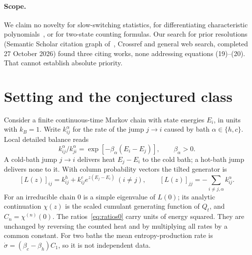 \documentclass[11pt,a4paper]{article}
\theoremstyle{remark}\newtheorem{remark}[theorem]{Remark}
\begin{document}
\paragraph{Scope.} We claim no novelty for slow-switching statistics, for differentiating characteristic polynomials~\cite{Bruderer2014}, or for two-state counting formulas. Our search for prior resolutions (Semantic Scholar citation graph of~\cite{Ptaszynski2022}, Crossref and general web search, completed 27 October 2026) found three citing works, none addressing equations (19)--(20). That cannot establish absolute priority.

\section{Setting and the conjectured class}\label{sec:defs}
Consider a finite continuous-time Markov chain with state energies $E_i$, in units with $k_B=1$. Write $k^\alpha_{ij}$ for the rate of the jump $j\to i$ caused by bath $\alpha\in\{h,c\}$. Local detailed balance reads
\begin{equation}\label{eq:ldb}
k^\alpha_{ij}/k^\alpha_{ji}=\exp[-\beta_\alpha(E_i-E_j)],\qquad\beta_\alpha>0.
\end{equation}
A cold-bath jump $j\to i$ delivers heat $E_j-E_i$ to the cold bath; a hot-bath jump delivers none to it. With column probability vectors the tilted generator is
\begin{equation}\label{eq:tilt}
[L(z)]_{ij}=k^h_{ij}+k^c_{ij}e^{z(E_j-E_i)}\ (i\ne j),\qquad[L(z)]_{jj}=-\textstyle\sum_{i\ne j,\alpha}k^\alpha_{ij}.
\end{equation}
For an irreducible chain $0$ is a simple eigenvalue of $L(0)$; its analytic continuation $\chi(z)$ is the scaled cumulant generating function of $Q_t$, and $C_n=\chi^{(n)}(0)$. The ratios~\eqref{eq:ratios0} carry units of energy squared. They are unchanged by reversing the counted heat and by multiplying all rates by a common constant. For two baths the mean entropy-production rate is $\dot\sigma=(\beta_c-\beta_h)C_1$, so it is not independent data.
\end{document}
